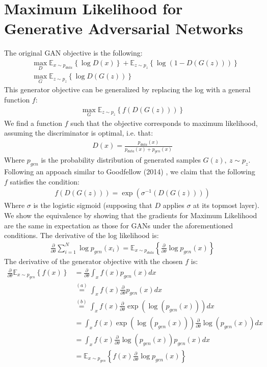 \documentclass[paper=a4, fontsize=11pt]{scrartcl} %
\numberwithin{equation}{section} %
\numberwithin{figure}{section} %
\numberwithin{table}{section} %
\newcommand{\Ex}[2]{\mathbb{E}_{#1}\left\{#2\right\}}
\newcommand{\dP}[2]{\frac{\partial #1}{\partial #2}}
\begin{document}
\section{Maximum Likelihood for Generative Adversarial Networks}

The original GAN objective is the following:
\begin{align*}
&\max_{D} \Ex{x\sim p_{data}}{\log D(x)} + \Ex{z\sim p_z}{\log(1-D(G(z)))}\\
&\max_{G} \Ex{z\sim p_z}{\log D(G(z))} 
\end{align*}
This generator objective can be generalized by replacing the log with a general function $f$:
\begin{align*}
\max_{G} \Ex{z\sim p_z}{f(D(G(z)))}
\end{align*}
We find a function $f$ such that the objective corresponds to maximum likelihood, assuming the discriminator is optimal, i.e. that:
\begin{align*}
D(x)=\frac{p_{data}(x)}{p_{data}(x)+p_{gen}(x)}
\end{align*}
Where $p_{gen}$ is the probability distribution of generated samples $G(z), \ z\sim p_z$. Following an appoach similar to Goodfellow (2014) \cite{2014arXiv1412.6515G}, we claim that the following $f$ satisfies the condition:
\begin{align*}
f(D(G(z))) = \exp( \sigma^{-1}(D(G(z))) )
\end{align*}
Where $\sigma$ is the logistic sigmoid (supposing that $D$ applies $\sigma$ at its topmost layer). We show the equivalence by showing that the gradients for Maximum Likelihood are the same in expectation as those for GANs under the aforementioned conditions. The derivative of the log likelihood is:
\begin{align*}
\dP{}{\theta}\sum_{i=1}^N\log p_{gen}(x_i) = \Ex{x\sim p_{data}}{\dP{}{\theta}\log p_{gen}(x)}
\end{align*}
\newpage
The derivative of the generator objective with the chosen $f$ is:
\begin{align*}
\dP{}{\theta}\Ex{x\sim p_{gen}}{f(x)}  &= \dP{}{\theta}\int_{x}f(x) p_{gen}(x)dx\\
&\overset{(a)}{=} \int_{x}f(x) \dP{}{\theta}p_{gen}(x)dx\\
&\overset{(b)}{=} \int_{x}f(x) \dP{}{\theta}\exp(\log(p_{gen}(x)))dx\\
&= \int_{x}f(x) \exp(\log(p_{gen}(x)))\dP{}{\theta}\log(p_{gen}(x))dx\\
&= \int_{x}f(x) \dP{}{\theta}\log(p_{gen}(x))p_{gen}(x)dx\\
&= \Ex{x\sim p_{gen}}{f(x) \dP{}{\theta}\log p_{gen}(x)}
\end{align*}
\end{document}
